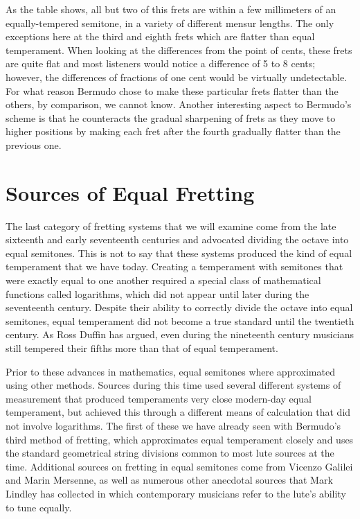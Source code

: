 As the table shows, all but two of this frets are within a few millimeters of an
equally-tempered semitone, in a variety of different mensur lengths. The only
exceptions here at the third and eighth frets which are flatter than equal temperament.
When looking at the differences from the point of cents, these frets are quite flat and
most listeners would notice a difference of 5 to 8 cents; however, the differences of
fractions of one cent would be virtually undetectable.  For what reason Bermudo chose
to make these particular frets flatter than the others, by comparison, we cannot know.
Another interesting aspect to Bermudo's scheme is that he counteracts the gradual
sharpening of frets as they move to higher positions by making each fret after the
fourth gradually flatter than the previous one.

\section{Sources of Equal Fretting}

The last category of fretting systems that we will examine come from the late sixteenth
and early seventeenth centuries and advocated dividing the octave into equal semitones.
This is not to say that these systems produced the kind of equal temperament that we
have today. Creating a temperament with semitones that were exactly equal to one
another required a special class of mathematical functions called logarithms, which did
not appear until later during the seventeenth century.  Despite their ability to
correctly divide the octave into equal semitones, equal temperament did not become a
true standard until the twentieth century.  As Ross Duffin has argued, even during the
nineteenth century musicians still tempered their fifths more than that of equal
temperament.

Prior to these advances in mathematics, equal semitones where approximated using other
methods. Sources during this time used several different systems of measurement that
produced temperaments very close modern-day equal temperament, but achieved this
through a different means of calculation that did not involve logarithms.  The first of
these we have already seen with Bermudo's third method of fretting, which approximates
equal temperament closely and uses the standard geometrical string divisions common to
most lute sources at the time.  Additional sources on fretting in equal semitones come
from Vicenzo Galilei and Marin Mersenne, as well as numerous other anecdotal sources
that Mark Lindley has collected in which contemporary musicians refer to the lute's
ability to tune equally.

